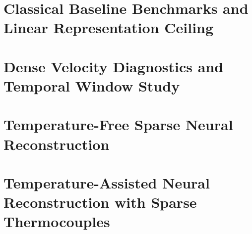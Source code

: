 
\section{Classical Baseline Benchmarks and Linear Representation Ceiling}
\label{sec:res_baselines}

\section{Dense Velocity Diagnostics and Temporal Window Study}
\label{sec:res_dense}

\section{Temperature-Free Sparse Neural Reconstruction}
\label{sec:res_sparse_free}

\section{Temperature-Assisted Neural Reconstruction with Sparse Thermocouples}
\label{sec:res_assisted}
